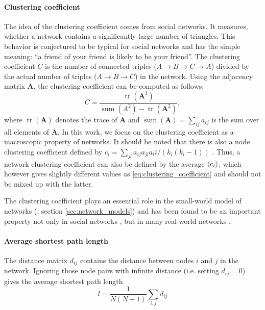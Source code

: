 \documentclass[openright,twoside,headsepline]{scrbook}
\begin{document}
\paragraph{Clustering coefficient\color{Cayenne}{.}}
The idea of the clustering coefficient comes from social networks.
It measures, whether a network contains a significantly large number of triangles.
This behavior is conjectured to be typical for social networks and has the simple meaning:
``a friend of your friend is likely to be your friend''.
The clustering coefficient $C$ is the number of connected triples ($A\rightarrow B \rightarrow C \rightarrow A$) divided by the actual number of triples ($A\rightarrow B \rightarrow C $) in the network.
Using the adjacency matrix $\mathbf{A}$, the clustering coefficient can be computed as follows:
\begin{equation}\label{eq:clustering_coefficient}
C=\frac{\operatorname{tr}(\mathbf{A}^3)}{\operatorname{sum} (A^2) -\operatorname{tr}(\mathbf{A}^2)},
\end{equation}
where $\operatorname{tr}(\mathbf{A} )$ denotes the trace of $\mathbf{A}$ and $\operatorname{sum} (\mathbf{A})=\sum _{ij} a_{ij}$ is the sum over all elements of $\mathbf{A}$.
In this work, we focus on the clustering coefficient as a macroscopic property of networks.
It should be noted that there is also a node clustering coefficient defined by $c_i=\sum _{jl} a_{ij}a_{jl}a_li/(k_i (k_i -1))$ \citep{Watts:1998,dynamical_processes}.
Thus, a network clustering coefficient can also be defined by the average $\left< c_i \right>$, which however gives slightly different values as \eqref{eq:clustering_coefficient} and should not be mixed up with the latter.


The clustering coefficient plays an essential role in the small-world model of networks (\citep{Watts:1998}, section \ref{sec:network_models}) and has been found to be an important property not only in social networks \citep{Holland1971}, but in many real-world networks \citep{Newman2003}.

\paragraph{Average shortest path length\color{Cayenne}{.}}
The distance matrix $d_{ij}$ contains the distance between nodes $i$ and $j$ in the network.
Ignoring those node pairs with infinite distance (i.e. setting $d_{ij}=0$) gives the average shortest path length
\begin{equation}\label{eq:}
l=\frac{1}{N(N-1)}\sum _{i, j} d_{ij}
\end{equation}
\end{document}
